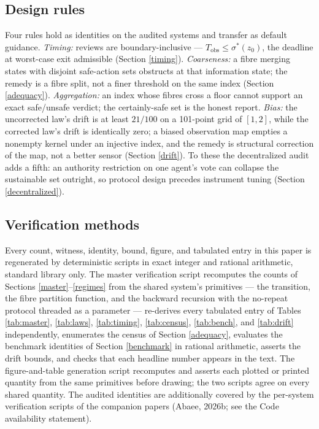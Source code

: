 \documentclass[10pt,twocolumn]{article}
\theoremstyle{definition}
\begin{document}
\subsection{Design rules}\label{rules}

Four rules hold as identities on the audited systems and transfer as
default guidance. \emph{Timing:} reviews are boundary-inclusive ---
\(T_{\mathrm{obs}} \le \sigma^{*}(z_0)\), the deadline at worst-case
exit admissible (Section \ref{timing}). \emph{Coarseness:} a fibre
merging states with disjoint safe-action sets obstructs at that
information state; the remedy is a fibre split, not a finer threshold
on the same index (Section \ref{adequacy}). \emph{Aggregation:} an
index whose fibres cross a floor cannot support an exact
safe/unsafe verdict; the certainly-safe set is the honest report.
\emph{Bias:} the uncorrected law's drift is at least \(21/100\) on a
101-point grid of \([1,2]\), while the corrected law's drift is
identically zero; a biased observation map empties a nonempty kernel
under an injective index, and the remedy is structural correction of
the map, not a better sensor (Section \ref{drift}). To these the
decentralized audit adds a fifth: an authority restriction on one
agent's vote can collapse the sustainable set outright, so protocol
design precedes instrument tuning (Section \ref{decentralized}).

\subsection{Verification methods}\label{methods}

Every count, witness, identity, bound, figure, and tabulated entry in
this paper is regenerated by deterministic scripts in exact integer and
rational arithmetic, standard library only. The master verification
script recomputes the counts of Sections \ref{master}--\ref{regimes}
from the shared system's primitives --- the transition, the fibre
partition function, and the backward recursion with the no-repeat
protocol threaded as a parameter --- re-derives every tabulated entry of
Tables \ref{tab:master}, \ref{tab:laws}, \ref{tab:timing},
\ref{tab:census}, \ref{tab:bench}, and \ref{tab:drift} independently,
enumerates the census of Section \ref{adequacy}, evaluates the
benchmark identities of Section \ref{benchmark} in rational
arithmetic, asserts the drift bounds, and checks that each headline
number appears in the text. The figure-and-table generation script
recomputes and asserts each plotted or printed quantity from the same
primitives before drawing; the two scripts agree on every shared
quantity. The audited identities are additionally covered by the
per-system verification scripts of the companion papers (Abaee, 2026b;
see the Code availability statement).
\end{document}
